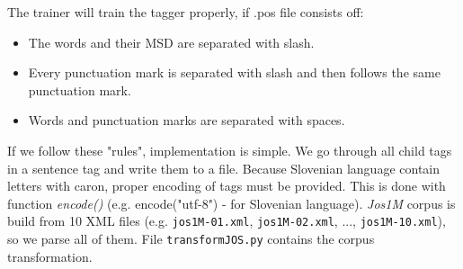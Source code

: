 \documentclass[10pt, conference, compsocconf]{IEEEtran}
\begin{document}
The trainer will train the tagger properly, if .pos file consists off:
\begin{itemize}
\item The words and their MSD are separated with slash.
\item Every punctuation mark is separated with slash and then follows the same punctuation mark.
\item Words and punctuation marks are separated with spaces.
\end{itemize}

If we follow these "rules", implementation is simple. We go through all child tags in a sentence tag and write them to a file. Because Slovenian language contain letters with caron, proper encoding of tags must be provided. This is done with function \textit{encode()} (e.g. encode("utf-8") - for Slovenian language).
\textit{Jos1M} corpus is build from 10 XML files (e.g. \texttt{jos1M-01.xml},  \texttt{jos1M-02.xml}, ..., \texttt{jos1M-10.xml}), so we parse all of them. 
File \texttt{transformJOS.py} contains the corpus transformation.
\end{document}
